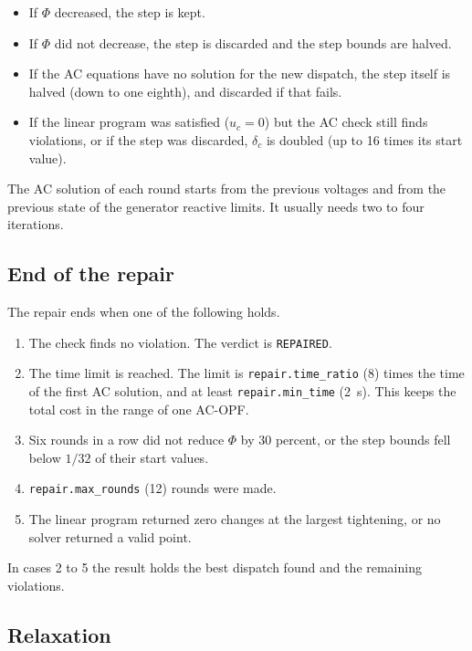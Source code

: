 \documentclass[a4paper,11pt]{article}
\newcommand{\opt}[1]{\texttt{#1}}
\begin{document}
\begin{itemize}[nosep]
  \item If $\Phi$ decreased, the step is kept.
  \item If $\Phi$ did not decrease, the step is discarded and the step bounds are halved.
  \item If the AC equations have no solution for the new dispatch, the step itself is halved (down to one eighth), and discarded if that fails.
  \item If the linear program was satisfied ($u_c=0$) but the AC check still finds violations, or if the step was discarded, $\delta_c$ is doubled (up to 16 times its start value).
\end{itemize}

The AC solution of each round starts from the previous voltages and from the previous state of the generator reactive limits. It usually needs two to four iterations.

\subsection{End of the repair}\label{sec:repair-stop}

The repair ends when one of the following holds.

\begin{enumerate}[nosep]
  \item The check finds no violation. The verdict is \texttt{REPAIRED}.
  \item The time limit is reached. The limit is \opt{repair.time\_ratio} (8) times the time of the first AC solution, and at least \opt{repair.min\_time} (2~s). This keeps the total cost in the range of one AC-OPF.
  \item Six rounds in a row did not reduce $\Phi$ by 30 percent, or the step bounds fell below $1/32$ of their start values.
  \item \opt{repair.max\_rounds} (12) rounds were made.
  \item The linear program returned zero changes at the largest tightening, or no solver returned a valid point.
\end{enumerate}

In cases 2 to 5 the result holds the best dispatch found and the remaining violations.

\subsection{Relaxation}\label{sec:relax}
\end{document}
